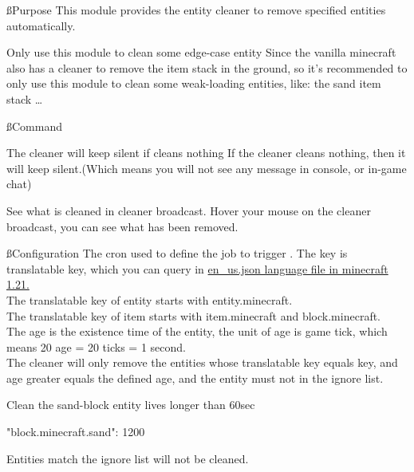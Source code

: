 
\ss{Purpose}
This module provides the entity cleaner to remove specified entities automatically.

\begin{note}{Only use this module to clean some edge-case entity}
    Since the vanilla minecraft also has a cleaner to remove the item stack in the ground, so it's recommended to only use this module to clean some weak-loading entities, like: the sand item stack \ldots
\end{note}


\ss{Command}
\begin{note}{The cleaner will keep silent if cleans nothing}
    If the cleaner cleans nothing, then it will keep silent.(Which means you will not see any message in console, or in-game chat)
\end{note}

\begin{tips}{See what is cleaned in cleaner broadcast.}
    Hover your mouse on the cleaner broadcast, you can see what has been removed.
\end{tips}

\ss{Configuration}
The cron used to define the job to trigger .
The key is translatable key, which you can query in \href{https://github.com/sakurawald/fuji-fabric/blob/dev/.github/files/en_us.json}{en\_us.json language file in minecraft 1.21.} \\
The translatable key of entity starts with entity.minecraft. \\
The translatable key of item starts with item.minecraft and block.minecraft. \\
The age is the existence time of the entity, the unit of age is game tick, which means 20 age = 20 ticks = 1 second. \\
The cleaner will only remove the entities whose translatable key equals key, and age greater equals the defined age, and the entity must not in the ignore list.

\begin{example}{Clean the sand-block entity lives longer than 60sec}
    \begin{json}
        "block.minecraft.sand": 1200
    \end{json}
\end{example}

Entities match the ignore list will not be cleaned. \\

